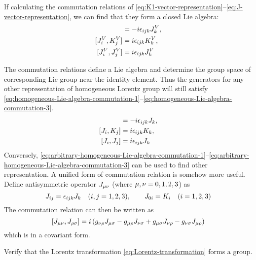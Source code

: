 If calculating the commutation relations of \eqref{eq:K1-vector-representation}--\eqref{eq:J-vector-representation}, we can find that they form a closed Lie algebra:
\begin{align}
  [K_i^V,K_j^V] &= -i \e_{ijk} J_k^V, \label{eq:homogeneous-Lie-algebra-commutation-1} \\
  [J_i^V,K_j^V] &=  i \e_{ijk} K_k^V, \label{eq:homogeneous-Lie-algebra-commutation-2} \\
  [J_i^V,J_j^V] &=  i \e_{ijk} J_k^V  \label{eq:homogeneous-Lie-algebra-commutation-3}
\end{align}

The commutation relations define a Lie algebra and determine the group space of corresponding Lie group near the identity element. Thus the generators for any other representation of homogeneous Lorentz group will still satisfy \eqref{eq:homogeneous-Lie-algebra-commutation-1}--\eqref{eq:homogeneous-Lie-algebra-commutation-3}.
\begin{align}
  [K_i,K_j] &= -i \e_{ijk} J_k, \label{eq:arbitrary-homogeneous-Lie-algebra-commutation-1} \\
  [J_i,K_j] &=  i \e_{ijk} K_k, \label{eq:arbitrary-homogeneous-Lie-algebra-commutation-2} \\
  [J_i,J_j] &=  i \e_{ijk} J_k  \label{eq:arbitrary-homogeneous-Lie-algebra-commutation-3}
\end{align}
Conversely, \eqref{eq:arbitrary-homogeneous-Lie-algebra-commutation-1}--\eqref{eq:arbitrary-homogeneous-Lie-algebra-commutation-3} can be used to find other representation. A unified form of commutation relation is somehow more useful. Define antisymmetric operator $J_{\mu\nu}$ (where $\mu,\nu = 0,1,2,3$) as
\begin{equation} \label{eq:redefine-Lorentz-generator-operators}
  J_{ij} = \epsilon_{ijk}J_k \quad (i,j = 1,2,3), \qquad
  J_{0i} = K_i \quad (i = 1,2,3)
\end{equation}
The commutation relation can then be written as
\begin{equation} \label{eq:Lorentz-operator-commutation-covariant-form}
  \comm{J_{\mu\nu}}{J_{\rh\s}} =
  i \, (  g_{\n\rh}J_{\m\s} - g_{\m\rh}J_{\n\s}
        + g_{\m\s}J_{\n\rh} - g_{\n\s}J_{\m\rh})
\end{equation}
which is in a covariant form.

\begin{Exe}
  Verify that the Lorentz transformation \eqref{eq:Lorentz-transformation} forms a group.
\end{Exe}

